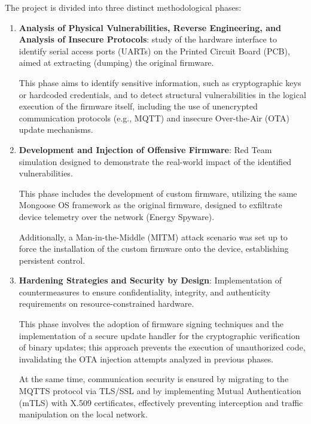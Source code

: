 \medskip
\noindent The project is divided into three distinct methodological phases: 
\begin{enumerate}
    \item \textbf{Analysis of Physical Vulnerabilities, Reverse Engineering, and Analysis of Insecure Protocols}: study of the hardware interface to identify serial access ports (UARTs) on the Printed Circuit Board (PCB), aimed at extracting (dumping) the original firmware.
    
    \noindent This phase aims to identify sensitive information, such as cryptographic keys or hardcoded credentials, and to detect structural vulnerabilities in the logical execution of the firmware itself, including the use of unencrypted communication protocols (e.g., MQTT) and insecure Over-the-Air (OTA) update mechanisms.
    
    \item \textbf{Development and Injection of Offensive Firmware}: Red Team simulation designed to demonstrate the real-world impact of the identified vulnerabilities.

    \noindent This phase includes the development of custom firmware, utilizing the same Mongoose OS framework as the original firmware, designed to exfiltrate device telemetry over the network (Energy Spyware).

    \noindent Additionally, a Man-in-the-Middle (MITM) attack scenario was set up to force the installation of the custom firmware onto the device, establishing persistent control. 
    
    \item \textbf{Hardening Strategies and Security by Design}: Implementation of countermeasures to ensure confidentiality, integrity, and authenticity requirements on resource-constrained hardware.

    \noindent This phase involves the adoption of firmware signing techniques and the implementation of a secure update handler for the cryptographic verification of binary updates; this approach prevents the execution of unauthorized code, invalidating the OTA injection attempts analyzed in previous phases.

    \noindent At the same time, communication security is ensured by migrating to the MQTTS protocol via TLS/SSL and by implementing Mutual Authentication (mTLS) with X.509 certificates, effectively preventing interception and traffic manipulation on the local network.
\end{enumerate}
